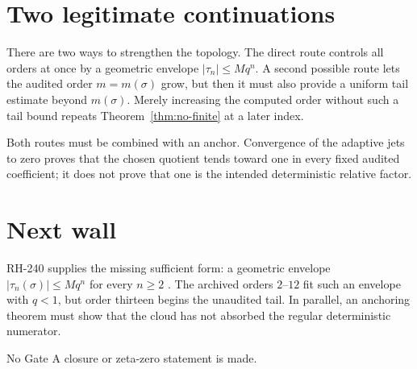 \documentclass[11pt]{article}
\theoremstyle{remark}
\begin{document}
\section{Two legitimate continuations}

There are two ways to strengthen the topology.  The direct route controls all
orders at once by a geometric envelope $|\tau_n|\le Mq^n$.  A second possible
route lets the audited order $m=m(\sigma)$ grow, but then it must also provide
a uniform tail estimate beyond $m(\sigma)$.  Merely increasing the computed
order without such a tail bound repeats Theorem~\ref{thm:no-finite} at a later
index.

Both routes must be combined with an anchor.  Convergence of the adaptive
jets to zero proves that the chosen quotient tends toward one in every fixed
audited coefficient; it does not prove that one is the intended deterministic
relative factor.

\section{Next wall}

RH-240 supplies the missing sufficient form: a geometric envelope
$|\tau_n(\sigma)|\le Mq^n$ for every $n\ge2$
\citep{WangRH240,Simon2005}.  The archived orders $2$--$12$
fit such an envelope with $q<1$, but order thirteen begins the unaudited tail.
In parallel, an anchoring theorem must show that the cloud has not absorbed
the regular deterministic numerator.

No Gate A closure or zeta-zero statement is made.



\end{document}
